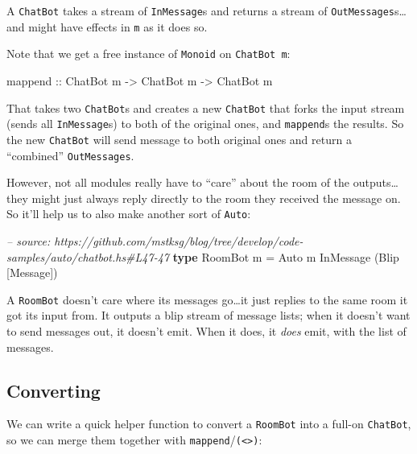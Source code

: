 \documentclass[]{article}
\newenvironment{Shaded}{}{}
\newcommand{\KeywordTok}[1]{\textcolor[rgb]{0.00,0.44,0.13}{\textbf{{#1}}}}
\newcommand{\DataTypeTok}[1]{\textcolor[rgb]{0.56,0.13,0.00}{{#1}}}
\newcommand{\CommentTok}[1]{\textcolor[rgb]{0.38,0.63,0.69}{\textit{{#1}}}}
\newcommand{\OtherTok}[1]{\textcolor[rgb]{0.00,0.44,0.13}{{#1}}}
\newcommand{\FunctionTok}[1]{\textcolor[rgb]{0.02,0.16,0.49}{{#1}}}
\newcommand{\NormalTok}[1]{{#1}}
\begin{document}
A \texttt{ChatBot} takes a stream of \texttt{InMessage}s and returns a stream of
\texttt{OutMessages}s\ldots{}and might have effects in \texttt{m} as it does so.

Note that we get a free instance of \texttt{Monoid} on \texttt{ChatBot\ m}:

\begin{Shaded}
\begin{Highlighting}[]
\OtherTok{mappend ::} \DataTypeTok{ChatBot} \NormalTok{m }\OtherTok{->} \DataTypeTok{ChatBot} \NormalTok{m }\OtherTok{->} \DataTypeTok{ChatBot} \NormalTok{m}
\end{Highlighting}
\end{Shaded}

That takes two \texttt{ChatBot}s and creates a new \texttt{ChatBot} that forks the input stream
(sends all \texttt{InMessage}s) to both of the original ones, and \texttt{mappend}s the results. So
the new \texttt{ChatBot} will send message to both original ones and return a ``combined''
\texttt{OutMessages}.

However, not all modules really have to ``care'' about the room of the outputs\ldots{}they might
just always reply directly to the room they received the message on. So it'll help us to also make
another sort of \texttt{Auto}:

\begin{Shaded}
\begin{Highlighting}[]
\CommentTok{-- source: https://github.com/mstksg/blog/tree/develop/code-samples/auto/chatbot.hs#L47-47}
\KeywordTok{type} \DataTypeTok{RoomBot} \NormalTok{m }\FunctionTok{=} \DataTypeTok{Auto} \NormalTok{m }\DataTypeTok{InMessage} \NormalTok{(}\DataTypeTok{Blip} \NormalTok{[}\DataTypeTok{Message}\NormalTok{])}
\end{Highlighting}
\end{Shaded}

A \texttt{RoomBot} doesn't care where its messages go\ldots{}it just replies to the same room it got
its input from. It outputs a blip stream of message lists; when it doesn't want to send messages
out, it doesn't emit. When it does, it \emph{does} emit, with the list of messages.

\subsection{Converting}\label{converting}

We can write a quick helper function to convert a \texttt{RoomBot} into a full-on \texttt{ChatBot},
so we can merge them together with \texttt{mappend}/\texttt{(\textless{}\textgreater{})}:
\end{document}
